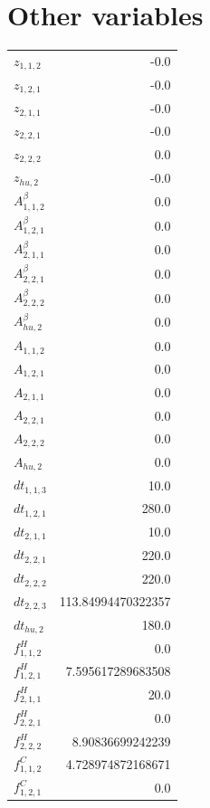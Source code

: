 \documentclass{article}%
\makeatletter
\let\mcnewpage=\newpage%
\newcommand{\TrickSupertabularIntoMulticols}{%
\renewcommand\newpage{%
\if@firstcolumn%
\hrule width\linewidth height0pt%
\columnbreak%
\else%
\mcnewpage%
\fi%
}%
}%
\makeatother
\begin{document}
\section{Other variables}%
\thispagestyle{plain}%
\begin{multicols*}{3}%
\TrickSupertabularIntoMulticols%
%
\begin{supertabular}{lr}%
	$z_{1,1,2}$ & -0.0 \\%
	$z_{1,2,1}$ & -0.0 \\%
	$z_{2,1,1}$ & -0.0 \\%
	$z_{2,2,1}$ & -0.0 \\%
	$z_{2,2,2}$ & 0.0 \\%
	$z_{hu,2}$ & -0.0 \\%
	$A_{1,1,2}^{\beta}$ & 0.0 \\%
	$A_{1,2,1}^{\beta}$ & 0.0 \\%
	$A_{2,1,1}^{\beta}$ & 0.0 \\%
	$A_{2,2,1}^{\beta}$ & 0.0 \\%
	$A_{2,2,2}^{\beta}$ & 0.0 \\%
	$A_{hu,2}^{\beta}$ & 0.0 \\%
	$A_{1,1,2}$ & 0.0 \\%
	$A_{1,2,1}$ & 0.0 \\%
	$A_{2,1,1}$ & 0.0 \\%
	$A_{2,2,1}$ & 0.0 \\%
	$A_{2,2,2}$ & 0.0 \\%
	$A_{hu,2}$ & 0.0 \\%
	$dt_{1,1,3}$ & 10.0 \\%
	$dt_{1,2,1}$ & 280.0 \\%
	$dt_{2,1,1}$ & 10.0 \\%
	$dt_{2,2,1}$ & 220.0 \\%
	$dt_{2,2,2}$ & 220.0 \\%
	$dt_{2,2,3}$ & 113.84994470322357 \\%
	$dt_{hu,2}$ & 180.0 \\%
	$f_{1,1,2}^{H}$ & 0.0 \\%
	$f_{1,2,1}^{H}$ & 7.595617289683508 \\%
	$f_{2,1,1}^{H}$ & 20.0 \\%
	$f_{2,2,1}^{H}$ & 0.0 \\%
	$f_{2,2,2}^{H}$ & 8.90836699242239 \\%
	$f_{1,1,2}^{C}$ & 4.728974872168671 \\%
	$f_{1,2,1}^{C}$ & 0.0 \\%

\end{supertabular}
\end{multicols*}
\end{document}
